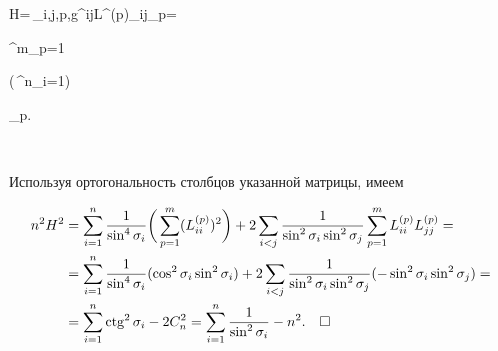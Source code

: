 H=\,\sum_{i,j,p,}g^{ij}L^{(p)}_{ij}\xi_p= 


\sum^m_{p=1} 


\biggl(\,\sum^n_{i=1}\biggr) 


\xi_p. 


$$ 


Используя ортогональность столбцов указанной матрицы, имеем 


\begin{align*} 


n^2H^2&=\sum^n_{i=1}\frac{1}{\sin^4\sigma_i} 


\biggl(\,\sum^m_{p=1}(L^{(p)}_{ii})^2\biggr)+ 


2\sum_{i<j}\frac{1}{\sin^2\sigma_i\sin^2\sigma_j} 


\sum^m_{p=1}L^{(p)}_{ii}L^{(p)}_{jj} = \\ 


&=\sum^n_{i=1}\frac{1}{\sin^4\sigma_i}(\cos^2\sigma_i 


\sin^2\sigma_i)+2\sum_{i<j} 


\frac{1}{\sin^2\sigma_i\sin^2\sigma_j} 


(-\sin^2\sigma_i\sin^2\sigma_j)= \\ 


&=\sum^n_{i=1}\ctg^2\sigma_i-2C^2_n= 


\sum^n_{i=1}\frac{1}{\sin^2\sigma_i}-n^2. 


\quad\square 


\end{align*} 


 


